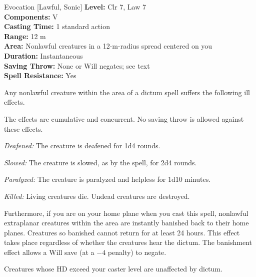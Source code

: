 {Evocation [Lawful, Sonic]}
{
	\textbf{Level:}
	Clr 7, Law 7\\
	\textbf{Components:}
	V\\
	\textbf{Casting Time:}
	1 standard action\\
	\textbf{Range:}
	12 m\\
	\textbf{Area:}
	Nonlawful creatures in a 12-m-radius spread centered on you\\
	\textbf{Duration:}
	Instantaneous\\
	\textbf{Saving Throw:}
	None or Will negates; see text\\
	\textbf{Spell Resistance:}
	Yes\\
}
{
	Any nonlawful creature within the area of a dictum spell suffers the following ill effects.

	The effects are cumulative and concurrent. No saving throw is allowed against these effects.

	\textit{Deafened:}
	The creature is deafened for 1d4 rounds.

	\textit{Slowed:}
	The creature is slowed, as by the  spell, for 2d4 rounds.

	\textit{Paralyzed:}
	The creature is paralyzed and helpless for 1d10 minutes.

	\textit{Killed:}
	Living creatures die. Undead creatures are destroyed.

	Furthermore, if you are on your home plane when you cast this spell, nonlawful extraplanar creatures within the area are instantly banished back to their home planes. Creatures so banished cannot return for at least 24 hours. This effect takes place regardless of whether the creatures hear the dictum. The banishment effect allows a Will save (at a $-4$ penalty) to negate.

	Creatures whose HD exceed your caster level are unaffected by dictum.

}
